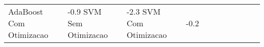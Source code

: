 \begin{table}[H]
\begin{adjustwidth}{ -1in }{ -1in }
\begin{tabular}{lllllllllll}
           AdaBoost Com Otimizacao &      -0.9%
                SVM Sem Otimizacao &      -2.3%
                SVM Com Otimizacao &      -0.2%
\bottomrule
\end{tabular}
    \end{adjustwidth}
    \renewcommand{\arraystretch}{1.0} %
\end{table}
